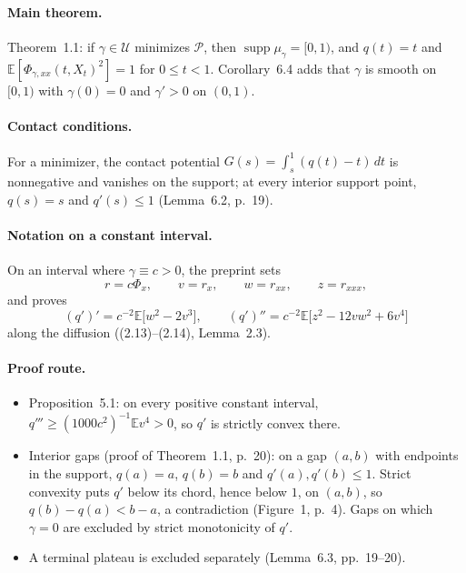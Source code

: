 \documentclass[11pt]{article}
\newcommand{\E}{\mathbb{E}}
\newcommand{\ploc}[2]{#1}
\begin{document}
\paragraph{Main theorem.}
\ploc{Theorem~1.1}{main.tex:119--131}: if $\gamma\in\mathcal U$ minimizes
$\mathcal P$, then $\operatorname{supp}\mu_\gamma=[0,1)$, and $q(t)=t$ and
$\E[\Phi_{\gamma,xx}(t,X_t)^2]=1$ for $0\le t<1$. Corollary~6.4 adds that
$\gamma$ is smooth on $[0,1)$ with $\gamma(0)=0$ and $\gamma'>0$ on $(0,1)$.

\paragraph{Contact conditions.}
For a minimizer, the contact potential
$G(s)=\int_s^1(q(t)-t)\,dt$ is nonnegative and vanishes on the support; at
every interior support point, $q(s)=s$ and $q'(s)\le1$
(\ploc{Lemma~6.2, p.~19}{variation.tex:81--128}).

\paragraph{Notation on a constant interval.}
On an interval where $\gamma\equiv c>0$, the preprint sets
\[
 r=c\Phi_x,\qquad v=r_x,\qquad w=r_{xx},\qquad z=r_{xxx},
\]
and proves
\[
 (q')'=c^{-2}\E\bigl[w^2-2v^3\bigr],\qquad
 (q')''=c^{-2}\E\bigl[z^2-12vw^2+6v^4\bigr]
\]
along the diffusion (\ploc{(2.13)--(2.14), Lemma~2.3}{regularity.tex:240--261}).

\paragraph{Proof route.}
\begin{itemize}
\item \ploc{Proposition~5.1}{curvature.tex:9--20}: on every positive constant
interval, $q'''\ge(1000c^2)^{-1}\E v^4>0$, so $q'$ is strictly convex there.
\item Interior gaps (\ploc{proof of Theorem~1.1, p.~20}{variation.tex:215--250}):
on a gap $(a,b)$ with endpoints in the support, $q(a)=a$, $q(b)=b$ and
$q'(a),q'(b)\le1$. Strict convexity puts $q'$ below its chord, hence below $1$,
on $(a,b)$, so $q(b)-q(a)<b-a$, a contradiction
(\ploc{Figure~1, p.~4}{gap-convexity.tex}). Gaps on which $\gamma=0$ are
excluded by strict monotonicity of $q'$.
\item A terminal plateau is excluded separately
(\ploc{Lemma~6.3, pp.~19--20}{variation.tex:130--213}).
\end{itemize}
\end{document}

